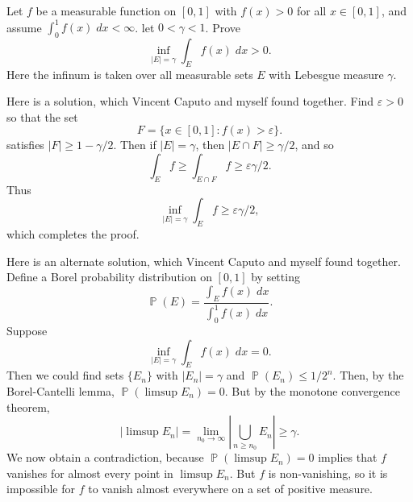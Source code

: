 \documentclass[answers]{exam}
\DeclareMathOperator{\PP}{\mathbb{P}}
\begin{document}
\begin{questions}
\question Let $f$ be a measurable function on $[0,1]$ with $f(x) > 0$ for all $x \in [0,1]$, and assume $\int_0^1 f(x)\; dx < \infty$. let $0 < \gamma < 1$. Prove
%
\[ \inf_{|E| = \gamma} \int_E f(x)\; dx > 0. \]
%
Here the infinum is taken over all measurable sets $E$ with Lebesgue measure $\gamma$.
\begin{solution}
	Here is a solution, which Vincent Caputo and myself found together. Find $\varepsilon > 0$ so that the set
	\[ F = \{  x\in [0,1] : f(x) > \varepsilon \}. \]
	satisfies $|F| \geq 1 - \gamma / 2$. Then if $|E| = \gamma$, then $|E \cap F| \geq \gamma/2$, and so
	\[ \int_E f \geq \int_{E \cap F} f \geq \varepsilon \gamma / 2. \]
	Thus
	\[ \inf_{|E| = \gamma} \int_E f \geq \varepsilon \gamma / 2, \]
	which completes the proof.

	Here is an alternate solution, which Vincent Caputo and myself found together. Define a Borel probability distribution on $[0,1]$ by setting
	\[ \PP(E) = \frac{\int_E f(x)\; dx}{\int_0^1 f(x)\; dx}. \]
	Suppose
	\[ \inf_{|E| = \gamma} \int_E f(x)\; dx = 0. \]
	Then we could find sets $\{ E_n \}$ with $|E_n| = \gamma$ and $\PP(E_n) \leq 1/2^n$. Then, by the Borel-Cantelli lemma, $\PP(\limsup E_n) = 0$. But by the monotone convergence theorem,
	\[ |\limsup E_n| = \lim_{n_0 \to \infty} \left| \bigcup_{n \geq n_0} E_n \right| \geq \gamma. \]
	We now obtain a contradiction, because $\PP(\limsup E_n) = 0$ implies that $f$ vanishes for almost every point in $\limsup E_n$. But $f$ is non-vanishing, so it is impossible for $f$ to vanish almost everywhere on a set of positive measure.


\end{solution}
\end{questions}
\end{document}
